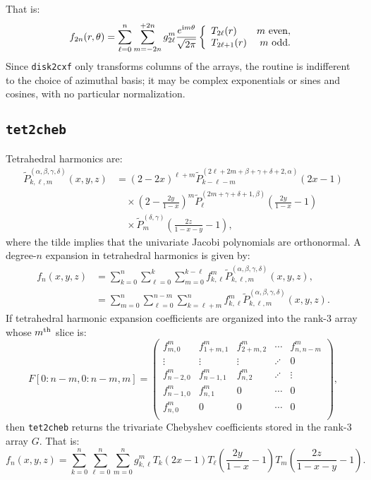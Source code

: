 \documentclass{article}
\def\ii{{\rm i}}
\begin{document}
That is:
\begin{equation}
f_{2n}(r,\theta) = \sum_{\ell=0}^{n}\sum_{m=-2n}^{+2n} g_{2\ell}^m \frac{e^{\ii m\theta}}{\sqrt{2\pi}} \left\{\begin{array}{lr} T_{2\ell}(r) & m~{\rm even},\\ T_{2\ell+1}(r) & m~{\rm odd}.\end{array}\right.
\end{equation}
Since {\tt disk2cxf} only transforms columns of the arrays, the routine is indifferent to the choice of azimuthal basis; it may be complex exponentials or sines and cosines, with no particular normalization.

\subsection{{\tt tet2cheb}}

Tetrahedral harmonics are:
\begin{align}
\tilde{P}_{k,\ell,m}^{(\alpha,\beta,\gamma,\delta)}(x,y,z) & = (2-2x)^{\ell+m} \tilde{P}_{k-\ell-m}^{(2\ell+2m+\beta+\gamma+\delta+2,\alpha)}(2x-1)\nonumber\\
& \quad \times \left(2-\frac{2y}{1-x}\right)^m \tilde{P}_\ell^{(2m+\gamma+\delta+1,\beta)}\left(\frac{2y}{1-x}-1\right)\\
& \quad \times \tilde{P}_m^{(\delta,\gamma)}\left(\frac{2z}{1-x-y}-1\right),\nonumber
\end{align}
where the tilde implies that the univariate Jacobi polynomials are orthonormal. A degree-$n$ expansion in tetrahedral harmonics is given by:
\begin{align}
f_n(x,y,z) & = \sum_{k=0}^n\sum_{\ell=0}^k\sum_{m=0}^{k-\ell} f_{k,\ell}^m \tilde{P}_{k,\ell,m}^{(\alpha,\beta,\gamma,\delta)}(x,y,z),\\
& = \sum_{m=0}^n\sum_{\ell=0}^{n-m}\sum_{k=\ell+m}^n f_{k,\ell}^m \tilde{P}_{k,\ell,m}^{(\alpha,\beta,\gamma,\delta)}(x,y,z).
\end{align}
If tetrahedral harmonic expansion coefficients are organized into the rank-$3$ array whose $m^{\rm th}$ slice is:
\begin{equation}
F[0:n-m,0:n-m,m] = \begin{pmatrix}
f_{m,0}^m & f_{1+m,1}^m & f_{2+m,2}^m & \cdots & f_{n,n-m}^m\\
\vdots & \vdots &  \vdots & \iddots & 0\\
f_{n-2,0}^m & f_{n-1,1}^m & f_{n,2}^m & \iddots & \vdots\\
f_{n-1,0}^m & f_{n,1}^m & 0 & \cdots & 0\\
f_{n,0}^m & 0 & 0 & \cdots & 0\\
\end{pmatrix},
\end{equation}
then {\tt tet2cheb} returns the trivariate Chebyshev coefficients stored in the rank-$3$ array $G$. That is:
\begin{equation}
f_n(x,y,z) = \sum_{k=0}^n\sum_{\ell=0}^n\sum_{m=0}^n g_{k,\ell}^m T_k(2x-1) T_\ell\left(\frac{2y}{1-x}-1\right) T_m\left(\frac{2z}{1-x-y}-1\right).
\end{equation}
\end{document}

